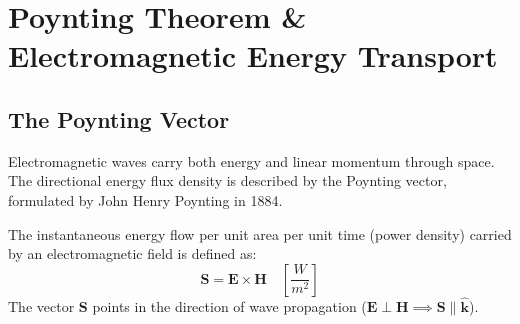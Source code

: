 \section{Poynting Theorem \& Electromagnetic Energy Transport}

\subsection{The Poynting Vector}
Electromagnetic waves carry both energy and linear momentum through space. The directional energy flux density is described by the Poynting vector, formulated by John Henry Poynting in 1884.

\begin{definition}
The instantaneous energy flow per unit area per unit time (power density) carried by an electromagnetic field is defined as:
\begin{equation}
    \mathbf{S} = \mathbf{E} \times \mathbf{H} \quad \left[\si{\frac{W}{m^2}}\right]
\end{equation}
The vector $\mathbf{S}$ points in the direction of wave propagation ($\mathbf{E} \perp \mathbf{H} \implies \mathbf{S} \parallel \hat{\mathbf{k}}$).
\end{definition}


